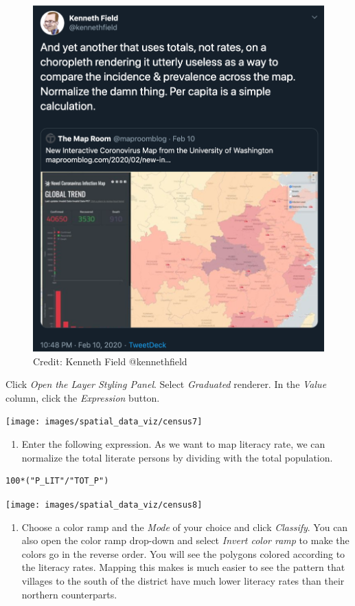 \documentclass[
  12pt,
  a4paper]{article}
\providecommand{\tightlist}{%
  \setlength{\itemsep}{0pt}\setlength{\parskip}{0pt}}
\begin{document}
\begin{figure}

{\centering \includegraphics[width=0.5\linewidth]{images/spatial_data_viz/totals_vs_rates} 

}

\caption{Credit: Kenneth Field @kennethfield}\label{fig:unnamed-chunk-73}
\end{figure}

Click \emph{Open the Layer Styling Panel}. Select \emph{Graduated}
renderer. In the \emph{Value} column, click the \emph{Expression}
button.

\begin{center}\texttt{[image: images/spatial\_data\_viz/census7]} \end{center}

\begin{enumerate}
\def\labelenumi{\arabic{enumi}.}
\setcounter{enumi}{7}
\tightlist
\item
  Enter the following expression. As we want to map literacy rate, we
  can normalize the total literate persons by dividing with the total
  population.
\end{enumerate}

\begin{verbatim}
100*("P_LIT"/"TOT_P")
\end{verbatim}

\begin{center}\texttt{[image: images/spatial\_data\_viz/census8]} \end{center}

\begin{enumerate}
\def\labelenumi{\arabic{enumi}.}
\setcounter{enumi}{8}
\tightlist
\item
  Choose a color ramp and the \emph{Mode} of your choice and click
  \emph{Classify}. You can also open the color ramp drop-down and select
  \emph{Invert color ramp} to make the colors go in the reverse order.
  You will see the polygons colored according to the literacy rates.
  Mapping this makes is much easier to see the pattern that villages to
  the south of the district have much lower literacy rates than their
  northern counterparts.
\end{enumerate}
\end{document}
